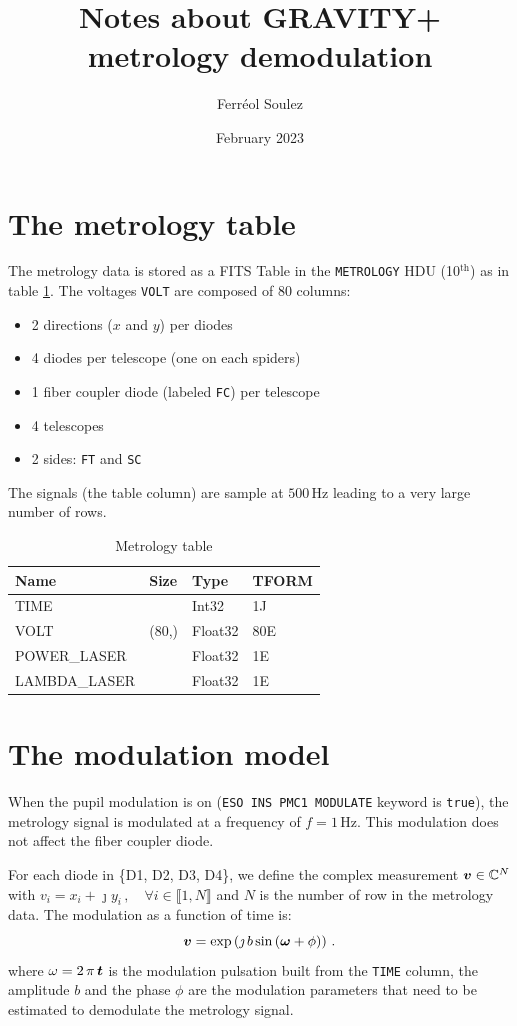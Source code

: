 \documentclass[a4paper,11pt,twoside]{scrartcl}
\title{Notes about GRAVITY+ metrology demodulation}
\author{Ferréol Soulez }
\date{February 2023}
\begin{document}
\maketitle

\section{The metrology table}
The metrology data is stored as a FITS Table in the \verb+METROLOGY+ HDU (10$^\textrm{th}$) as in table \ref{tab:table}. The voltages \verb+VOLT+ are composed of $80$ columns:
\begin{itemize}
    \item 2 directions ($x$ and  $y$) per diodes
    \item 4 diodes per telescope (one on each spiders)
    \item 1 fiber coupler diode (labeled \verb+FC+) per telescope
    \item 4 telescopes
    \item 2 sides: \verb|FT|  and \verb|SC|
\end{itemize}
The signals (the table column) are sample at $500\,$Hz leading to a very large number of rows. 
\begin{table}[]
    \centering
    \begin{tabular}{l| l ll}
Name   &       Size  & Type  &   TFORM   \\
\hline
TIME   &              & Int32  &  1J     \\
VOLT   &       (80,) & Float32 &  80E    \\
POWER\_LASER   &    &   Float32 & 1E     \\
LAMBDA\_LASER   &    &  Float32 & 1E     
    \end{tabular}
    \caption{Metrology table}
    \label{tab:table}
\end{table}

\section{The modulation model}

When the pupil modulation is on (\verb|ESO INS PMC1 MODULATE| keyword is \verb|true|), the metrology signal is modulated at a frequency of $f=1\,$Hz. 
This modulation does not affect the fiber coupler diode.

For each diode in \{D1, D2, D3, D4\}, we define the complex measurement $\boldsymbol{v} \in \mathbb{C}^N$  with $v_i =   x_i + \jmath y_i \,, \quad \forall i \in \llbracket 1,N \rrbracket $ and  $N$ is the number of row in the metrology data. The modulation as a function of time is:
\begin{equation}
    \boldsymbol{v} = \exp\left( \jmath \, b \sin\left( \boldsymbol{\omega} + \phi\right)\right)\,.\label{eq:v}
\end{equation}
where $\omega = 2\,\pi\,\boldsymbol{t}$ is the modulation pulsation built from the \verb|TIME| column, the amplitude $b$ and the phase $\phi$ are the modulation parameters that need to be estimated to demodulate the metrology signal.
\end{document}
